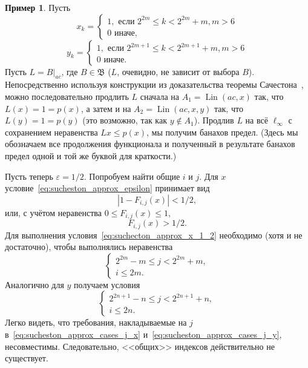 \documentclass[a4paper,openbib]{report}
\renewcommand{\leq}{\leqslant}
\theoremstyle{definition}
\newtheorem{example}[lemma]{Пример}
\begin{document}
\begin{example}
	Пусть
	\begin{equation}
		x_k = \begin{cases}
			1, \mbox{~если~} 2^{2m} \leq k < 2^{2m} + m, m > 6
			\\
			0 \mbox{~иначе,~}
		\end{cases}
	\end{equation}
	\begin{equation}
		y_k = \begin{cases}
			1, \mbox{~если~} 2^{2m+1} \leq k < 2^{2m+1} + m, m > 6
			\\
			0 \mbox{~иначе.}
		\end{cases}
	\end{equation}
	Пусть $L = B|_{ac}$, где $B\in\mathfrak{B}$ ($L$, очевидно, не зависит от выбора $B$).
	Непосредственно используя конструкции из доказательства теоремы Сачестона~\cite{sucheston1967banach},
	можно последовательно продлить $L$ сначала на $A_1 = \operatorname{Lin}(ac, x)$
	так, что $L(x) = 1 = p(x)$,
	а затем и на $A_2 = \operatorname{Lin}(ac, x,y)$
	так, что $L(y) = 1 = p(y)$
	(это возможно, так как $y\notin A_1$).
	Продлив $L$ на всё $\ell_\infty$ с сохранением неравенства $Lx\leq p(x)$,
	мы получим банахов предел.
	(Здесь мы обозначаем все продолжения функционала и полученный в результате банахов предел одной и той же буквой
	для краткости.)

	Пусть теперь $\varepsilon = 1/2$.
	Попробуем найти общие $i$ и $j$.
	Для $x$ условие~\eqref{eq:sucheston_approx_epsilon} принимает вид
	\begin{equation}
		|1 - F_{i,j}(x)| < 1/2
		,
	\end{equation}
	или, с учётом неравенства $0 \leq F_{i,j}(x) \leq 1$,
	\begin{equation}
		\label{eq:suchecton_approx_x_1_2}
		F_{i,j}(x) > 1/2
		.
	\end{equation}
	Для выполнения условия~\eqref{eq:suchecton_approx_x_1_2} необходимо (хотя и не достаточно),
	чтобы выполнялись неравенства
	\begin{equation}
		\label{eq:sucheston_approx_cases_j_x}
		\begin{cases}
			 2^{2m} - m \leq j < 2^{2m} + m,
			 \\
			 i \leq 2m
			 .
		\end{cases}
	\end{equation}
	Аналогично для $y$ получаем условия
	\begin{equation}
		\label{eq:sucheston_approx_cases_j_y}
		\begin{cases}
			 2^{2n+1} - n \leq j < 2^{2n+1} + n,
			 \\
			 i \leq 2n
			 .
		\end{cases}
	\end{equation}
	Легко видеть, что требования, накладываемые на $j$ в~\eqref{eq:sucheston_approx_cases_j_x} и~\eqref{eq:sucheston_approx_cases_j_y},
	несовместимы.
	Следовательно, <<общих>> индексов действительно не существует.
\end{example}
\end{document}
